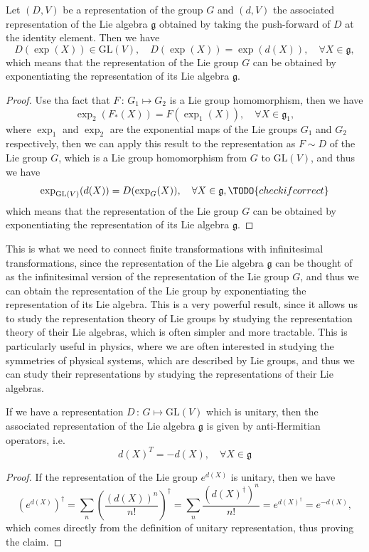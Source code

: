 \begin{corollary}
    Let \((D,V)\) be a representation of the group \(G\) and \((d,V)\) the associated representation of the Lie algebra \(\mathfrak{g}\) obtained by taking the push-forward of \(D\) at the identity element. Then we have
    \[
        D(\exp(X)) \in \mathrm{GL}(V), \quad D(\exp(X)) = \exp(d(X)), \quad \forall X \in \mathfrak{g},
    \]
    which means that the representation of the Lie group \(G\) can be obtained by exponentiating the representation of its Lie algebra \(\mathfrak{g}\).
\end{corollary}
\begin{proof}
    Use tha fact that \(F\,:\, G_1 \mapsto G_2\) is a Lie group homomorphism, then we have
    \[
        \exp_2(F_*(X)) = F(\exp_1(X)), \quad \forall X \in \mathfrak{g}_1,
    \]
    where \(\exp_1\) and \(\exp_2\) are the exponential maps of the Lie groups \(G_1\) and \(G_2\) respectively, then we can apply this result to the representation as \(F \sim D\) of the Lie group \(G\), which is a Lie group homomorphism from \(G\) to \(\mathrm{GL}(V)\), and thus we have
    \[
        \exp_{\mathrm{GL}(V)}(d(X)) = D(\exp_G(X)), \quad \forall X \in \mathfrak{g},\TODO{check if correct}
    \]
    which means that the representation of the Lie group \(G\) can be obtained by exponentiating the representation of its Lie algebra \(\mathfrak{g}\).
\end{proof}

This is what we need to connect finite transformations with infinitesimal transformations, since the representation of the Lie algebra \(\mathfrak{g}\) can be thought of as the infinitesimal version of the representation of the Lie group \(G\), and thus we can obtain the representation of the Lie group by exponentiating the representation of its Lie algebra. This is a very powerful result, since it allows us to study the representation theory of Lie groups by studying the representation theory of their Lie algebras, which is often simpler and more tractable. This is particularly useful in physics, where we are often interested in studying the symmetries of physical systems, which are described by Lie groups, and thus we can study their representations by studying the representations of their Lie algebras.

\begin{corollary}
    If we have a representation \(D \,:\, G \mapsto \mathrm{GL}(V)\) which is unitary, then the associated representation of the Lie algebra \(\mathfrak{g}\) is given by anti-Hermitian operators, i.e.
    \[
        d(X)^T = -d(X), \quad \forall X \in \mathfrak{g}
    \]
\end{corollary}
\begin{proof}
    If the representation of the Lie group \(e^{d(X)}\) is unitary, then we have
    \[
        \left( e^{d(X)} \right)^{\dagger} = \sum_{n} \left( \frac{(d(X))^n}{n!} \right)^\dagger = \sum_{n} \frac{(d(X)^{\dagger})^n}{n!} = e^{d(X)^{\dagger}} = e^{-d(X)},
    \]
    which comes directly from the definition of unitary representation, thus proving the claim.
\end{proof}

